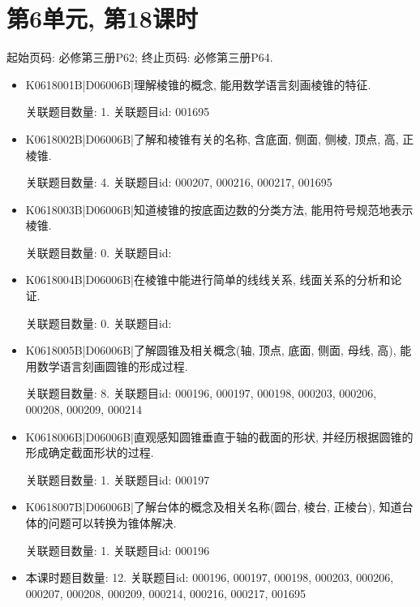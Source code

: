 \section*{第6单元, 第18课时}
起始页码: 必修第三册P62; 终止页码: 必修第三册P64.
\begin{itemize}
\item K0618001B|D06006B|理解棱锥的概念, 能用数学语言刻画棱锥的特征.

关联题目数量: 1. 关联题目id: 001695

\item K0618002B|D06006B|了解和棱锥有关的名称, 含底面, 侧面, 侧棱, 顶点, 高, 正棱锥.

关联题目数量: 4. 关联题目id: 000207, 000216, 000217, 001695

\item K0618003B|D06006B|知道棱锥的按底面边数的分类方法, 能用符号规范地表示棱锥.

关联题目数量: 0. 关联题目id: 

\item K0618004B|D06006B|在棱锥中能进行简单的线线关系, 线面关系的分析和论证.

关联题目数量: 0. 关联题目id: 

\item K0618005B|D06006B|了解圆锥及相关概念(轴, 顶点, 底面, 侧面, 母线, 高), 能用数学语言刻画圆锥的形成过程.

关联题目数量: 8. 关联题目id: 000196, 000197, 000198, 000203, 000206, 000208, 000209, 000214

\item K0618006B|D06006B|直观感知圆锥垂直于轴的截面的形状, 并经历根据圆锥的形成确定截面形状的过程.

关联题目数量: 1. 关联题目id: 000197

\item K0618007B|D06006B|了解台体的概念及相关名称(圆台, 棱台, 正棱台), 知道台体的问题可以转换为锥体解决.

关联题目数量: 1. 关联题目id: 000196

\item 本课时题目数量: 12. 关联题目id: 000196, 000197, 000198, 000203, 000206, 000207, 000208, 000209, 000214, 000216, 000217, 001695

\end{itemize}

